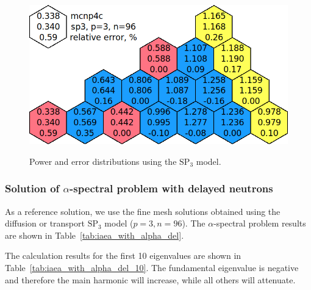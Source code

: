 \documentclass[a4paper]{jpconf}
\begin{document}
\begin{figure}[htp]
\begin{center}
	\includegraphics[width=0.75\linewidth]{sp3.png}\\
	\caption{Power and error distributions using the $\mathrm{SP_3}$ model.}
	\label{fig:power_iaea_with_sp3}
\end{center}
\end{figure}

\subsubsection{Solution of $\alpha$-spectral problem with delayed neutrons}

As a reference solution, we use the fine mesh solutions obtained using the diffusion or transport $\mathrm{SP_3}$ model ($ p = 3, n = 96 $).
The $\alpha$-spectral problem results are shown in Table~\ref{tab:iaea_with_alpha_del}.

The calculation results for the first 10 eigenvalues are shown in Table~\ref{tab:iaea_with_alpha_del_10}.
The fundamental eigenvalue is negative and therefore the main harmonic will increase, while all others will attenuate. 
\end{document}
